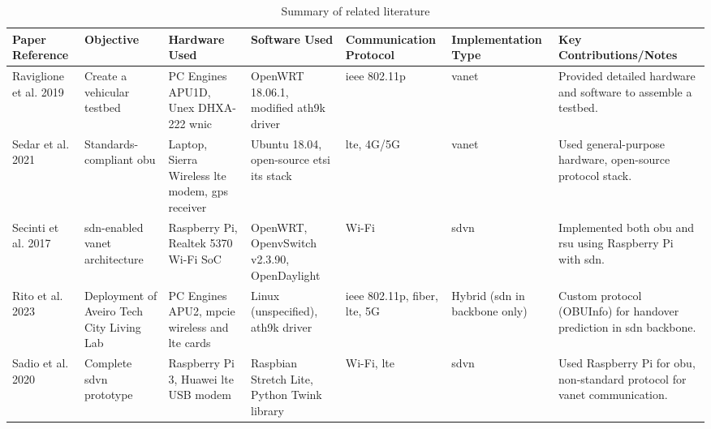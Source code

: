 \begin{table}[ht]
	\centering
	\begin{tabular}{|p{1.5cm}|p{1.7cm}|p{2cm}|p{1.6cm}|p{1.6cm}|p{1.8cm}|p{2.5cm}|}
	\hline
	\textbf{Paper Reference} & \textbf{Objective} & \textbf{Hardware Used} & \textbf{Software Used} & \textbf{Commu\-nication Protocol} & \textbf{Imple\-mentation Type} & \textbf{Key Contributions/Notes} \\ \hline
	
	Raviglione et al. 2019~\cite{raviglione_open_2019} & Create a vehicular testbed & PC Engines APU1D, Unex DHXA-222 \gls{wnic} & OpenWRT 18.06.1, modified ath9k driver & \gls{ieee} 802.11p & \gls{vanet} & Provided detailed hardware and software to assemble a testbed. \\ \hline
	
	Sedar et al. 2021~\cite{sedar_standards-compliant_2021} & Standards-compliant \gls{obu} & Laptop, Sierra Wireless \gls{lte} modem, \gls{gps} receiver & Ubuntu 18.04, open-source \gls{etsi} \gls{its} stack & \gls{lte}, 4G/5G & \gls{vanet} & Used general-purpose hardware, open-source protocol stack. \\ \hline
	
	Secinti et al. 2017~\cite{secinti_software_2017} & \gls{sdn}-enabled \gls{vanet} architecture & Raspberry Pi, Realtek 5370 Wi-Fi SoC & OpenWRT, OpenvSwitch v2.3.90, OpenDaylight & Wi-Fi & \gls{sdvn} & Implemented both \gls{obu} and \gls{rsu} using Raspberry Pi with \gls{sdn}. \\ \hline
	
	Rito et al. 2023~\cite{rito_aveiro_2023} & Deployment of Aveiro Tech City Living Lab & PC Engines APU2, \gls{mpcie} wireless and \gls{lte} cards & Linux (unspecified), ath9k driver & \gls{ieee} 802.11p, fiber, \gls{lte}, 5G & Hybrid (\gls{sdn} in backbone only) & Custom protocol (OBUInfo) for handover prediction in \gls{sdn} backbone. \\ \hline
	
	Sadio et al. 2020~\cite{sadio_design_2020} & Complete \gls{sdvn} prototype & Raspberry Pi 3, Huawei \gls{lte} USB modem & Raspbian Stretch Lite, Python Twink library & Wi-Fi, \gls{lte} & \gls{sdvn} & Used Raspberry Pi for \gls{obu}, non-standard protocol for \gls{vanet} communication. \\ \hline
	
	\end{tabular}
	\caption{Summary of related literature}
	\label{table:related}
\end{table}
	
